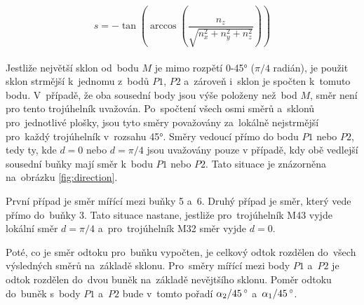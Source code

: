 \begin{equation}
 s = -\tan \left( \arccos \left( \frac{n_z}{\sqrt{n_x^2 + n_y^2 + n_z^2}} \right) \right) \label{eq:slope}
\end{equation} \\[0.2cm]
Jestliže největší sklon od~bodu $M$ je mimo rozpětí 0-45° ($\pi/4$ radián), je použit sklon strmější k~jednomu z~bodů $P1$, $P2$ a~zároveň i~sklon je spočten k~tomuto bodu.
V~případě, že oba sousední body jsou výše položeny než~bod $M$, směr není pro tento trojúhelník uvažován. Po~spočtení všech osmi směrů a~sklonů pro~jednotlivé plošky,
jsou tyto směry považovány za~lokálně nejstrmější pro~každý trojúhelník v~rozsahu 45°. Směry vedoucí přímo do bodu $P1$ nebo $P2$, tedy ty, kde $d = 0$ nebo $d = \pi/4$
jsou uvažovány pouze v případě, kdy obě vedlejší sousední buňky mají směr k~bodu $P1$ nebo $P2$. Tato situace je znázorněna na~obrázku \ref{fig:direction}. 
\par První případ je směr mířící mezi buňky 5 a~6. Druhý případ je směr, který vede přímo do~buňky 3. Tato situace nastane, jestliže pro~trojúhelník M43 vyjde lokální směr $d = \pi/4$
a~pro~trojúhelník M32 směr vyjde $d = 0$.
\par Poté, co je směr odtoku pro~buňku vypočten, je celkový odtok rozdělen do~všech výsledných směrů na~základě sklonu.
Pro~směry mířící mezi body $P1$ a~$P2$ je odtok rozdělen do~dvou buněk na~základě nevějtšího sklonu. Poměr odtoku do~buněk s~body $P1$ a~$P2$ bude v~tomto pořadí $\alpha_2/45\,^{\circ}{\rm}$ a~$\alpha_1/45\,^{\circ}{\rm}$.


